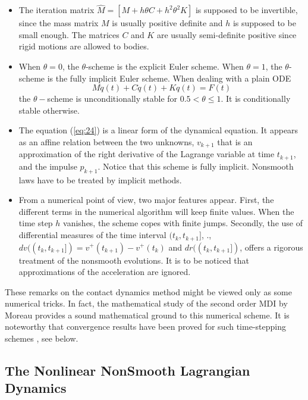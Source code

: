 \begin{itemize}

\item The iteration matrix $ \widehat{M} = \left[M+h\theta C + h^2 \theta^2 K \right] $ is supposed to be invertible,
since the mass matrix $M$ is usually positive definite and $h$ is supposed to be small enough.
The matrices $C$ and $K$ are  usually semi-definite positive since rigid motions are allowed to bodies.

\item  When $\theta=0$, the $\theta$-scheme is the explicit Euler scheme. When $\theta=1$, the $\theta$-scheme is the fully
implicit Euler scheme. When dealing with a plain ODE
\begin{equation}
    M\ddot{q}(t)  + C \dot{q}(t) + K q(t)  = F(t)
\end{equation}
the $\theta-$scheme is unconditionally stable for $0.5 < \theta \leq 1$. It is conditionally stable otherwise.


\item The equation (\ref{eq:24}) is a linear form of the dynamical equation. It appears
as an affine relation between the two unknowns, $v_{k+1}$ that is an approximation of the right derivative of the Lagrange variable
at time $t_{k+1}$, and the impulse $p_{k+1}$. Notice that this scheme is fully implicit. Nonsmooth laws have to be treated by implicit methods.


\item From a numerical point of view, two major features appear. First, the different terms in
the numerical algorithm will keep finite values. When the time step $h$ vanishes, the scheme copes with finite jumps.
Secondly, the use of differential measures of the time interval $(t_k,t_{k+1}]$, \ie{}.,
$dv((t_{k},t_{k+1}])=v^+(t_{k+1})-v^+(t_{k})$ and $dr((t_{k},t_{k+1}])$,
offers a rigorous treatment of the nonsmooth evolutions.  It is to be noticed that approximations of the acceleration are ignored.

\end{itemize}

These remarks on the contact dynamics method might be viewed only as some numerical tricks. In fact, the
mathematical study of the second order MDI by Moreau provides a sound mathematical ground to this numerical scheme.
It is noteworthy that convergence results have been proved for such time-stepping schemes \cite{Marques1993,Stewart1998,Mabrouk1998,dzonou2007}, see below.

\subsection{The Nonlinear  NonSmooth Lagrangian Dynamics}
\label{section11.1.2}

